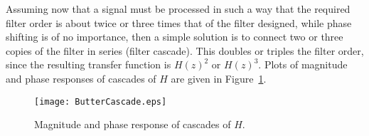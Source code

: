 \noindent Assuming now that a signal must be processed in such a way that the required filter order is about twice or three times that of the filter designed, while phase shifting is of no importance, then a simple solution is to connect two or three copies of the filter in series (filter cascade). This doubles or triples the filter order, since the resulting transfer function is $H(z)^2$ or $H(z)^3$. Plots of magnitude and phase responses of cascades of $H$ are given in Figure~\ref{fig:ButterCascade}.

\begin{figure}[H]
\center
\texttt{[image: ButterCascade.eps]}
\caption{Magnitude and phase response of cascades of $H$.}
\label{fig:ButterCascade}
\end{figure}


